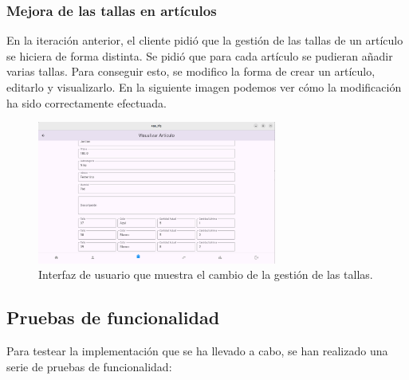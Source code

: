 \subsubsection{Mejora de las tallas en artículos}

En la iteración anterior, el cliente pidió que la gestión de las tallas de un artículo se hiciera de forma distinta. Se pidió que para cada artículo se pudieran añadir varias tallas. Para conseguir esto, se modifico la forma de crear un artículo, editarlo y visualizarlo. En la siguiente imagen podemos ver cómo la modificación ha sido correctamente efectuada. 

\begin{figure}[H]
	\centering
	\includegraphics[width=0.7\textwidth]{imagenes/SegundaIteracion/tallasMultiples.png}
	\caption{Interfaz de usuario que muestra el cambio de la gestión de las tallas.}
	\label{fig:appPantallaDetallesDevolucion}
\end{figure}


\subsection{Pruebas de funcionalidad}

Para testear la implementación que se ha llevado a cabo, se han realizado una serie de pruebas de funcionalidad: 

